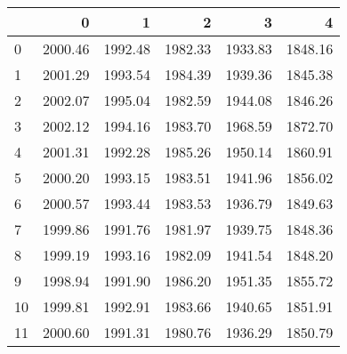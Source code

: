 \begin{tabular}{lrrrrr}
\toprule
{} &        0 &        1 &        2 &        3 &        4 \\
\midrule
0  &  2000.46 &  1992.48 &  1982.33 &  1933.83 &  1848.16 \\
1  &  2001.29 &  1993.54 &  1984.39 &  1939.36 &  1845.38 \\
2  &  2002.07 &  1995.04 &  1982.59 &  1944.08 &  1846.26 \\
3  &  2002.12 &  1994.16 &  1983.70 &  1968.59 &  1872.70 \\
4  &  2001.31 &  1992.28 &  1985.26 &  1950.14 &  1860.91 \\
5  &  2000.20 &  1993.15 &  1983.51 &  1941.96 &  1856.02 \\
6  &  2000.57 &  1993.44 &  1983.53 &  1936.79 &  1849.63 \\
7  &  1999.86 &  1991.76 &  1981.97 &  1939.75 &  1848.36 \\
8  &  1999.19 &  1993.16 &  1982.09 &  1941.54 &  1848.20 \\
9  &  1998.94 &  1991.90 &  1986.20 &  1951.35 &  1855.72 \\
10 &  1999.81 &  1992.91 &  1983.66 &  1940.65 &  1851.91 \\
11 &  2000.60 &  1991.31 &  1980.76 &  1936.29 &  1850.79 \\
\bottomrule
\end{tabular}

